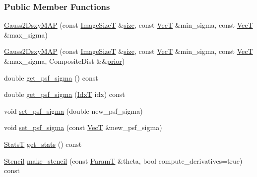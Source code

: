 \subsubsection*{Public Member Functions}
\begin{DoxyCompactItemize}
\item 
\hyperlink{classmappel_1_1Gauss2DsxyMAP_ae474967915073889d814003ce724e9d8}{Gauss2\+Dsxy\+M\+AP} (const \hyperlink{classmappel_1_1ImageFormat1DBase_a6456bab2b26702022ee32ae19e90dcac}{Image\+SizeT} \&\hyperlink{classmappel_1_1ImageFormat1DBase_a8941b4d028e4dd881146a7c1b9039bb1}{size}, const \hyperlink{namespacemappel_a2225ad69f358daa3f4f99282a35b9a3a}{VecT} \&min\+\_\+sigma, const \hyperlink{namespacemappel_a2225ad69f358daa3f4f99282a35b9a3a}{VecT} \&max\+\_\+sigma)
\item 
\hyperlink{classmappel_1_1Gauss2DsxyMAP_a95458ade16e460390f6987adfe17f1c9}{Gauss2\+Dsxy\+M\+AP} (const \hyperlink{classmappel_1_1ImageFormat1DBase_a6456bab2b26702022ee32ae19e90dcac}{Image\+SizeT} \&\hyperlink{classmappel_1_1ImageFormat1DBase_a8941b4d028e4dd881146a7c1b9039bb1}{size}, const \hyperlink{namespacemappel_a2225ad69f358daa3f4f99282a35b9a3a}{VecT} \&min\+\_\+sigma, const \hyperlink{namespacemappel_a2225ad69f358daa3f4f99282a35b9a3a}{VecT} \&max\+\_\+sigma, Composite\+Dist \&\&\hyperlink{classmappel_1_1PointEmitterModel_a393839f8eb1dd3d61c9369377742ba0e}{prior})
\item 
double \hyperlink{classmappel_1_1Gauss1DModel_a8786ff874e58de054ab3633a5f201192}{get\+\_\+psf\+\_\+sigma} () const 
\item 
double \hyperlink{classmappel_1_1Gauss1DModel_ae7bd64fb97894f9657be0a4b542aa3c6}{get\+\_\+psf\+\_\+sigma} (\hyperlink{namespacemappel_ab17ec0f30b61ece292439d7ece81d3a8}{IdxT} idx) const 
\item 
void \hyperlink{classmappel_1_1Gauss1DModel_a5c09d4cf98de58fb67d881b560e6a3e8}{set\+\_\+psf\+\_\+sigma} (double new\+\_\+psf\+\_\+sigma)
\item 
void \hyperlink{classmappel_1_1Gauss1DModel_accb0aad54534660e5acd2d6fc01268f1}{set\+\_\+psf\+\_\+sigma} (const \hyperlink{namespacemappel_a2225ad69f358daa3f4f99282a35b9a3a}{VecT} \&new\+\_\+psf\+\_\+sigma)
\item 
\hyperlink{namespacemappel_a04ab395b0cf82c4ce68a36b2212649a5}{StatsT} \hyperlink{classmappel_1_1Gauss1DModel_a61904b6e14e7429ee58175cb54259ed9}{get\+\_\+stats} () const 
\item 
\hyperlink{classmappel_1_1Gauss1DModel_1_1Stencil}{Stencil} \hyperlink{classmappel_1_1Gauss1DModel_a3068438846f29467b2df5a8504151c20}{make\+\_\+stencil} (const \hyperlink{classmappel_1_1PointEmitterModel_a665ec6aea3aac139bb69a23c06d4b9a1}{ParamT} \&theta, bool compute\+\_\+derivatives=true) const 

\end{DoxyCompactItemize}
